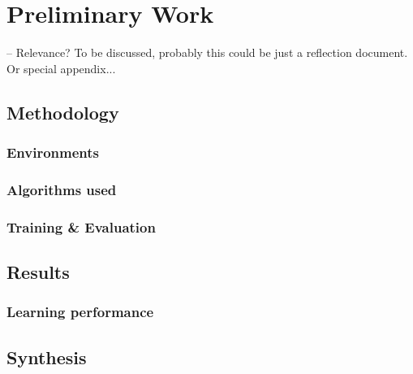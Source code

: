\chapter{Preliminary Work}
\label{chapter:prw}
-- Relevance? To be discussed, probably this could be just a reflection document. Or special appendix...
\section{Methodology}
\label{section:prw-methodology}

\subsection{Environments}
\label{subsection:prw-env}

\subsection{Algorithms used}
\label{subsection:prw-algorithms}

\subsection{Training \& Evaluation}
\label{subsection:prw-training-and-eval}

\section{Results}
\label{section:prw-results}

\subsection{Learning performance}
\label{subsection:prw-learning-performance}

\section{Synthesis}
\label{section:prw-synthesis}



